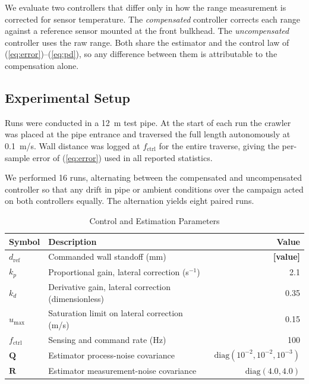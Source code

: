 We evaluate two controllers that differ only in how the range measurement is corrected
for sensor temperature. The \emph{compensated} controller corrects each range against a
reference sensor mounted at the front bulkhead. The \emph{uncompensated} controller uses
the raw range. Both share the estimator and the control law of
(\ref{eq:error})--(\ref{eq:pd}), so any difference between them is attributable to the
compensation alone.

\subsection{Experimental Setup}

Runs were conducted in a 12~m test pipe. At the start of each run the crawler was placed
at the pipe entrance and traversed the full length autonomously at 0.1~m/s. Wall
distance was logged at $f_{\mathrm{ctrl}}$ for the entire traverse, giving the
per-sample error of (\ref{eq:error}) used in all reported statistics.

We performed 16 runs, alternating between the compensated and uncompensated controller
so that any drift in pipe or ambient conditions over the campaign acted on both
controllers equally. The alternation yields eight paired runs.

\begin{table}[t]
\caption{Control and Estimation Parameters}
\label{tab:params}
\centering
\small
\setlength{\tabcolsep}{4pt}
\begin{tabular}{llr}
\toprule
Symbol & Description & Value \\
\midrule
$d_{\mathrm{ref}}$ & Commanded wall standoff (mm) & \textbf{[value]} \\
$k_p$ & Proportional gain, lateral correction (s$^{-1}$) & 2.1 \\
$k_d$ & Derivative gain, lateral correction (dimensionless) & 0.35 \\
$u_{\max}$ & Saturation limit on lateral correction (m/s) & 0.15 \\
$f_{\mathrm{ctrl}}$ & Sensing and command rate (Hz) & 100 \\
$\mathbf{Q}$ & Estimator process-noise covariance & $\mathrm{diag}(10^{-2}, 10^{-2}, 10^{-3})$ \\
$\mathbf{R}$ & Estimator measurement-noise covariance & $\mathrm{diag}(4.0, 4.0)$ \\
\bottomrule
\end{tabular}
\end{table}

